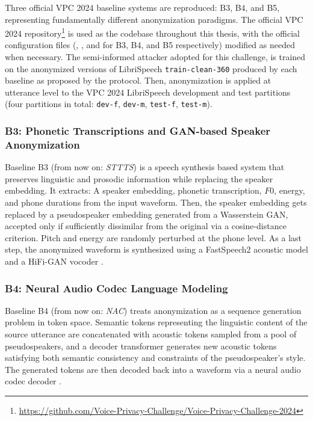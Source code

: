 \documentclass[12pt,leqno,a4paper]{article}
\begin{document}
Three official VPC 2024 baseline systems are reproduced: B3, B4, and 
B5, representing fundamentally different anonymization paradigms. The 
official VPC 2024 repository\footnote{\url{https://github.com/Voice-Privacy-Challenge/Voice-Privacy-Challenge-2024}} 
is used as the codebase throughout this thesis, with the official configuration files 
(, , and 
 for B3, B4, and B5 respectively) modified as needed when necessary. The semi-informed attacker adopted for this challenge, is trained on the anonymized versions of LibriSpeech \texttt{train-clean-360} \citep{librispeech} produced by each baseline as proposed by the protocol. 
Then, anonymization is applied at utterance level to the VPC 2024 LibriSpeech development and test partitions (four partitions in total: \texttt{dev-f}, \texttt{dev-m}, \texttt{test-f}, \texttt{test-m}).

\subsubsection{B3: Phonetic Transcriptions and GAN-based Speaker 
Anonymization}

Baseline B3 (from now on: \textit{STTTS}) is a speech synthesis based 
system that preserves linguistic and prosodic information while replacing 
the speaker embedding. It extracts: A speaker embedding, phonetic 
transcription, $F0$, energy, and phone durations from the input waveform. 
Then, the speaker embedding gets replaced by a pseudospeaker 
embedding generated from a Wasserstein GAN, accepted only if sufficiently 
dissimilar from the original via a cosine-distance criterion. Pitch 
and energy are randomly perturbed at the phone level. As a last step, the anonymized 
waveform is synthesized using a FastSpeech2 acoustic model and a 
HiFi-GAN vocoder \citep{tomashenko2024voiceprivacy2024challengeevaluation}.

\subsubsection{B4: Neural Audio Codec Language Modeling}

Baseline B4 (from now on: \textit{NAC}) treats anonymization as a sequence generation problem in token space. Semantic tokens 
representing the linguistic content of the source utterance are 
concatenated with acoustic tokens sampled from a pool of pseudospeakers, 
and a decoder transformer generates new acoustic tokens satisfying both 
semantic consistency and constraints of the pseudospeaker's style. The generated 
tokens are then decoded back into a waveform via a neural audio codec 
decoder \citep{tomashenko2024voiceprivacy2024challengeevaluation}.
\end{document}
